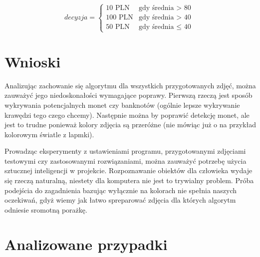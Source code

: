 \documentclass{mwart}
\begin{document}
$$
decyzja = \left\{\begin{array}{ll}
\textrm{10 PLN} & \textrm{gdy średnia $>$ 80}\\
\textrm{100 PLN} & \textrm{gdy średnia $>$ 40}\\
\textrm{50 PLN} & \textrm{gdy średnia $\leq$ 40 }
\end{array} \right.
$$

\section{Wnioski}
Analizując zachowanie się algorytmu dla wszystkich przygotowanych zdjęć, można zauważyć jego niedoskonałości wymagające poprawy. Pierwszą rzeczą jest sposób wykrywania potencjalnych monet czy banknotów (ogólnie lepsze wykrywanie krawędzi tego czego chcemy).
Następnie można by poprawić detekcję monet, ale jest to trudne ponieważ kolory zdjęcia są przeróżne (nie mówiąc już o na przykład kolorowym światle z lapmki).

Prowadząc eksperymenty z ustawieniami programu, przygotowanymi zdjęciami testowymi czy zastosowanymi rozwiązaniami, można zauważyć potrzebę użycia sztucznej inteligencji w projekcie.
Rozpoznawanie obiektów dla człowieka wydaje się rzeczą naturalną, niestety dla komputera nie jest to trywialny problem. Próba podejścia do zagadnienia bazując wyłącznie na kolorach nie spełnia naszych oczekiwań, gdyż wiemy jak łatwo spreparować zdjęcia dla których algorytm odniesie sromotną porażkę.

\section{Analizowane przypadki}
\end{document}
